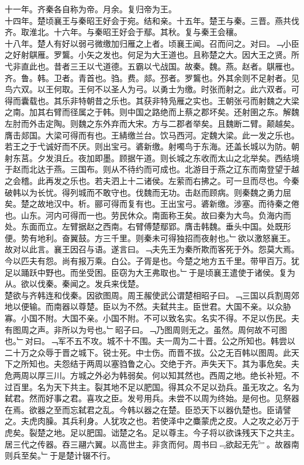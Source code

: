 \documentclass{zhvt-classic}
\begin{document}
\hspace*{2em}十一年。齐秦各自称为帝。月余。复归帝为王。\\
\hspace*{2em}十四年。楚顷襄王与秦昭王好会于宛。结和亲。十五年。楚王与秦。三晋。燕共伐齐。取淮北。十六年。与秦昭王好会于鄢。其秋。复与秦王会穰。\\
\hspace*{2em}十八年。楚人有好以弱弓微缴加归雁之上者。顷襄王闻。召而问之。对曰。﹁小臣之好射鶀雁。罗鸗。小矢之发也。何足为大王道也。且称楚之大。因大王之贤。所弋非直此也。昔者三王以弋道德。五霸以弋战国。故秦。魏。燕。赵者。鶀雁也。齐。鲁。韩。卫者。青首也。驺。费。郯。邳者。罗鸗也。外其余则不足射者。见鸟六双。以王何取。王何不以圣人为弓。以勇士为缴。时张而射之。此六双者。可得而囊载也。其乐非特朝昔之乐也。其获非特凫雁之实也。王朝张弓而射魏之大梁之南。加其右臂而径属之于韩。则中国之路绝而上蔡之郡坏矣。还射圉之东。解魏左肘而外击定陶。则魏之东外弃而大宋。方与二郡者举矣。且魏断二臂。颠越矣。膺击郯国。大梁可得而有也。王綪缴兰台。饮马西河。定魏大梁。此一发之乐也。若王之于弋诚好而不厌。则出宝弓。碆新缴。射噣鸟于东海。还盖长城以为防。朝射东莒。夕发浿丘。夜加即墨。顾据午道。则长城之东收而太山之北举矣。西结境于赵而北达于燕。三国布。则从不待约而可成也。北游目于燕之辽东而南登望于越之会稽。此再发之乐也。若夫泗上十二诸侯。左萦而右拂之。可一旦而尽也。今秦破韩以为长忧。得列城而不敢守也。伐魏而无功。击赵而顾病。则秦魏之勇力屈矣。楚之故地汉中。析。郦可得而复有也。王出宝弓。碆新缴。涉塞。而待秦之倦也。山东。河内可得而一也。劳民休众。南面称王矣。故曰秦为大鸟。负海内而处。东面而立。左臂据赵之西南。右臂傅楚鄢郢。膺击韩魏。垂头中国。处既形便。势有地利。奋翼鼓。方三千里。则秦未可得独招而夜射也。﹂欲以激怒襄王。故对以此言。襄王因召与语。遂言曰。﹁夫先王为秦所欺而客死于外。怨莫大焉。今以匹夫有怨。尚有报万乘。白公。子胥是也。今楚之地方五千里。带甲百万。犹足以踊跃中野也。而坐受困。臣窃为大王弗取也。﹂于是顷襄王遣使于诸侯。复为从。欲以伐秦。秦闻之。发兵来伐楚。\\
\hspace*{2em}楚欲与齐韩连和伐秦。因欲图周。周王赧使武公谓楚相昭子曰。﹁三国以兵割周郊地以便输。而南器以尊楚。臣以为不然。夫弑共主。臣世君。大国不亲。以众胁寡。小国不附。大国不亲。小国不附。不可以致名实。名实不得。不足以伤民。夫有图周之声。非所以为号也。﹂昭子曰。﹁乃图周则无之。虽然。周何故不可图也。﹂对曰。﹁军不五不攻。城不十不围。夫一周为二十晋。公之所知也。韩尝以二十万之众辱于晋之城下。锐士死。中士伤。而晋不拔。公之无百韩以图周。此天下之所知也。夫怨结于两周以塞驺鲁之心。交绝于齐。声失天下。其为事危矣。夫危两周以厚三川。方城之外必为韩弱矣。何以知其然也。西周之地。绝长补短。不过百里。名为天下共主。裂其地不足以肥国。得其众不足以劲兵。虽无攻之。名为弑君。然而好事之君。喜攻之臣。发号用兵。未尝不以周为终始。是何也。见祭器在焉。欲器之至而忘弑君之乱。今韩以器之在楚。臣恐天下以器仇楚也。臣请譬之。夫虎肉臊。其兵利身。人犹攻之也。若使泽中之麋蒙虎之皮。人之攻之必万于虎矣。裂楚之地。足以肥国。诎楚之名。足以尊主。今子将以欲诛残天下之共主。居三代之传器。吞三翮六翼。以高世主。非贪而何。周书曰﹃欲起无先﹄。故器南则兵至矣。﹂于是楚计辍不行。\\
\end{document}
